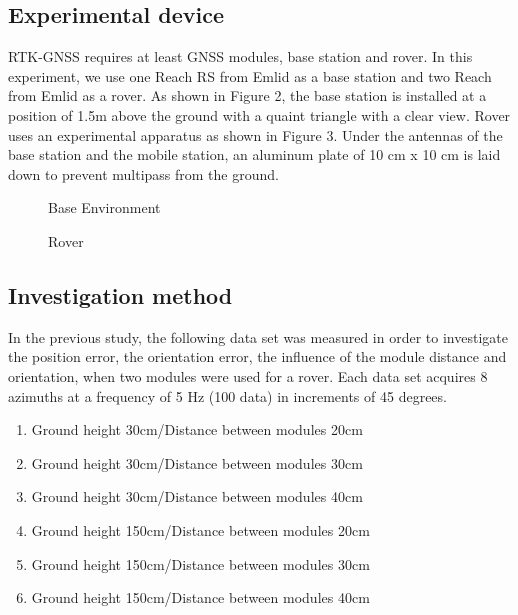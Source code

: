 \documentclass[a4paper]{article}
\begin{document}
\subsection{Experimental device}
RTK-GNSS requires at least GNSS modules, base station and rover. 
In this experiment, we use one Reach RS\cite{reach rs} from Emlid as a base station 
and two Reach\cite{reach} from Emlid as a rover.
As shown in Figure 2, the base station is installed at a position of 1.5m above the ground 
with a quaint triangle with a clear view.
Rover uses an experimental apparatus as shown in Figure 3. 
Under the antennas of the base station and the mobile station, 
an aluminum plate of 10 cm x 10 cm is laid down to prevent multipass from the ground.

\begin{figure}[H]
    \centerline{}
    \caption{Base Environment}
\end{figure}
\begin{figure}[H]
    \centerline{}
    \caption{Rover}
\end{figure}

\subsection{Investigation method}
In the previous study, the following data set was measured in order to 
investigate the position error, the orientation error, 
the influence of the module distance and orientation, when two modules were used for a rover.
Each data set acquires 8 azimuths at a frequency of 5 Hz (100 data) in increments of 45 degrees.
\begin{enumerate}
    \renewcommand{\labelenumi}{(\roman{enumi})}
    \item Ground height 30cm/Distance between modules 20cm
    \item Ground height 30cm/Distance between modules 30cm
    \item Ground height 30cm/Distance between modules 40cm
    \item Ground height 150cm/Distance between modules 20cm
    \item Ground height 150cm/Distance between modules 30cm
    \item Ground height 150cm/Distance between modules 40cm
\end{enumerate}
\end{document}
